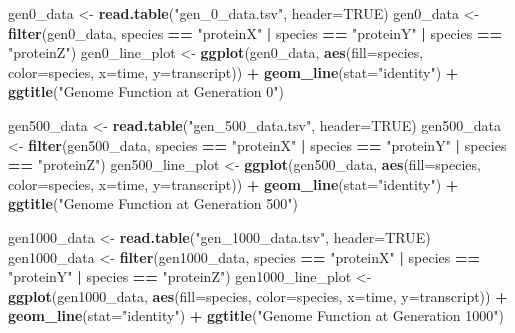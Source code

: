\documentclass[]{article}
\newenvironment{Shaded}{\begin{snugshade}}{\end{snugshade}}
\newcommand{\DataTypeTok}[1]{\textcolor[rgb]{0.13,0.29,0.53}{#1}}
\newcommand{\KeywordTok}[1]{\textcolor[rgb]{0.13,0.29,0.53}{\textbf{#1}}}
\newcommand{\NormalTok}[1]{#1}
\newcommand{\OperatorTok}[1]{\textcolor[rgb]{0.81,0.36,0.00}{\textbf{#1}}}
\newcommand{\OtherTok}[1]{\textcolor[rgb]{0.56,0.35,0.01}{#1}}
\newcommand{\StringTok}[1]{\textcolor[rgb]{0.31,0.60,0.02}{#1}}
\begin{document}
\begin{Shaded}
\begin{Highlighting}[]
\NormalTok{gen0_data <-}\StringTok{ }\KeywordTok{read.table}\NormalTok{(}\StringTok{"gen_0_data.tsv"}\NormalTok{, }\DataTypeTok{header=}\OtherTok{TRUE}\NormalTok{)}
\NormalTok{gen0_data <-}\StringTok{ }\KeywordTok{filter}\NormalTok{(gen0_data, species }\OperatorTok{==}\StringTok{ "proteinX"} \OperatorTok{|}\StringTok{ }\NormalTok{species }\OperatorTok{==}\StringTok{ "proteinY"} \OperatorTok{|}\StringTok{ }\NormalTok{species }\OperatorTok{==}\StringTok{ "proteinZ"}\NormalTok{)}
\NormalTok{gen0_line_plot <-}\StringTok{  }\KeywordTok{ggplot}\NormalTok{(gen0_data, }\KeywordTok{aes}\NormalTok{(}\DataTypeTok{fill=}\NormalTok{species, }\DataTypeTok{color=}\NormalTok{species, }\DataTypeTok{x=}\NormalTok{time, }\DataTypeTok{y=}\NormalTok{transcript)) }\OperatorTok{+}\StringTok{ }\KeywordTok{geom_line}\NormalTok{(}\DataTypeTok{stat=}\StringTok{"identity"}\NormalTok{) }\OperatorTok{+}\StringTok{ }\KeywordTok{ggtitle}\NormalTok{(}\StringTok{"Genome Function at Generation 0"}\NormalTok{)}
  
\NormalTok{gen500_data <-}\StringTok{ }\KeywordTok{read.table}\NormalTok{(}\StringTok{"gen_500_data.tsv"}\NormalTok{, }\DataTypeTok{header=}\OtherTok{TRUE}\NormalTok{)}
\NormalTok{gen500_data <-}\StringTok{ }\KeywordTok{filter}\NormalTok{(gen500_data, species }\OperatorTok{==}\StringTok{ "proteinX"} \OperatorTok{|}\StringTok{ }\NormalTok{species }\OperatorTok{==}\StringTok{ "proteinY"} \OperatorTok{|}\StringTok{ }\NormalTok{species }\OperatorTok{==}\StringTok{ "proteinZ"}\NormalTok{)}
\NormalTok{gen500_line_plot <-}\StringTok{  }\KeywordTok{ggplot}\NormalTok{(gen500_data, }\KeywordTok{aes}\NormalTok{(}\DataTypeTok{fill=}\NormalTok{species, }\DataTypeTok{color=}\NormalTok{species, }\DataTypeTok{x=}\NormalTok{time, }\DataTypeTok{y=}\NormalTok{transcript)) }\OperatorTok{+}\StringTok{ }\KeywordTok{geom_line}\NormalTok{(}\DataTypeTok{stat=}\StringTok{"identity"}\NormalTok{) }\OperatorTok{+}\StringTok{ }\KeywordTok{ggtitle}\NormalTok{(}\StringTok{"Genome Function at Generation 500"}\NormalTok{)}

\NormalTok{gen1000_data <-}\StringTok{ }\KeywordTok{read.table}\NormalTok{(}\StringTok{"gen_1000_data.tsv"}\NormalTok{, }\DataTypeTok{header=}\OtherTok{TRUE}\NormalTok{)}
\NormalTok{gen1000_data <-}\StringTok{ }\KeywordTok{filter}\NormalTok{(gen1000_data, species }\OperatorTok{==}\StringTok{ "proteinX"} \OperatorTok{|}\StringTok{ }\NormalTok{species }\OperatorTok{==}\StringTok{ "proteinY"} \OperatorTok{|}\StringTok{ }\NormalTok{species }\OperatorTok{==}\StringTok{ "proteinZ"}\NormalTok{)}
\NormalTok{gen1000_line_plot <-}\StringTok{  }\KeywordTok{ggplot}\NormalTok{(gen1000_data, }\KeywordTok{aes}\NormalTok{(}\DataTypeTok{fill=}\NormalTok{species, }\DataTypeTok{color=}\NormalTok{species, }\DataTypeTok{x=}\NormalTok{time, }\DataTypeTok{y=}\NormalTok{transcript)) }\OperatorTok{+}\StringTok{ }\KeywordTok{geom_line}\NormalTok{(}\DataTypeTok{stat=}\StringTok{"identity"}\NormalTok{) }\OperatorTok{+}\StringTok{ }\KeywordTok{ggtitle}\NormalTok{(}\StringTok{"Genome Function at Generation 1000"}\NormalTok{)}


\end{Highlighting}
\end{Shaded}
\end{document}
